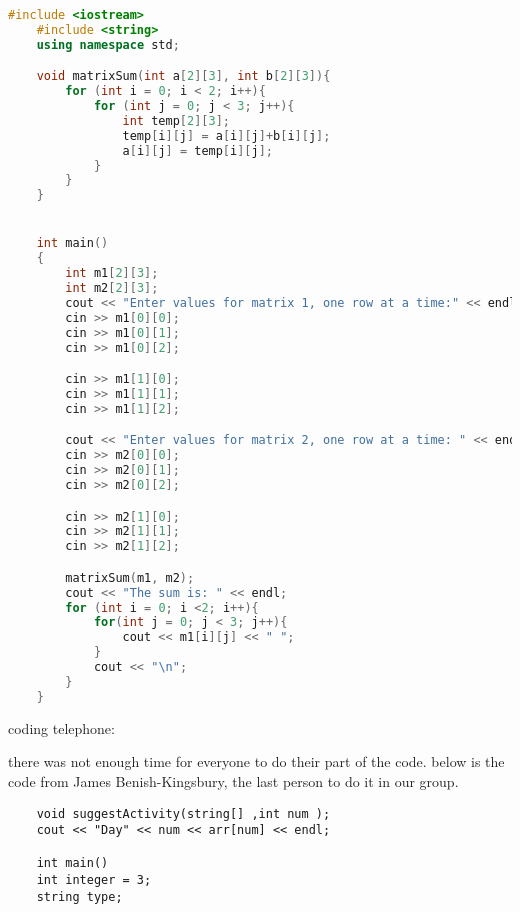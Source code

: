 \documentclass{article}
\begin{document}
\begin{lstlisting}[language=C++]
    #include <iostream>
    #include <string>
    using namespace std;

    void matrixSum(int a[2][3], int b[2][3]){
        for (int i = 0; i < 2; i++){
            for (int j = 0; j < 3; j++){
                int temp[2][3];
                temp[i][j] = a[i][j]+b[i][j];
                a[i][j] = temp[i][j];
            }
        }
    }


    int main() 
    {
        int m1[2][3];
        int m2[2][3];
        cout << "Enter values for matrix 1, one row at a time:" << endl;
        cin >> m1[0][0];
        cin >> m1[0][1];
        cin >> m1[0][2];

        cin >> m1[1][0];
        cin >> m1[1][1];
        cin >> m1[1][2];

        cout << "Enter values for matrix 2, one row at a time: " << endl;
        cin >> m2[0][0];
        cin >> m2[0][1];
        cin >> m2[0][2];

        cin >> m2[1][0];
        cin >> m2[1][1];
        cin >> m2[1][2];

        matrixSum(m1, m2);
        cout << "The sum is: " << endl;
        for (int i = 0; i <2; i++){
            for(int j = 0; j < 3; j++){
                cout << m1[i][j] << " ";
            }
            cout << "\n";
        }
    }
\end{lstlisting}

\vspace{1cm}
coding telephone:

there was not enough time for everyone to do their part of the code. below is the code from James Benish-Kingsbury, the last person to do it in our group.

\begin{verbatim}
    void suggestActivity(string[] ,int num );
    cout << "Day" << num << arr[num] << endl;

    int main()
    int integer = 3;
    string type;
\end{verbatim}
\end{document}
